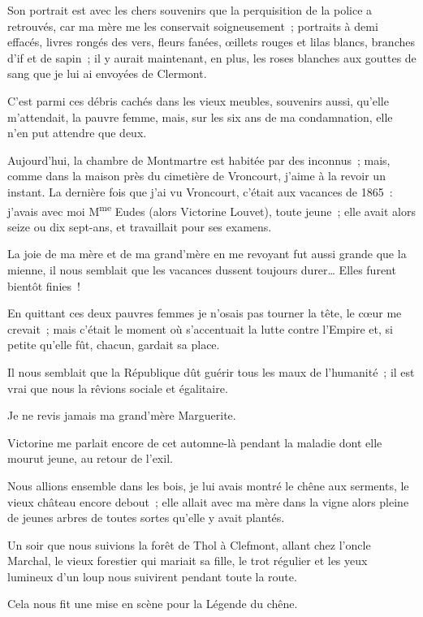 \documentclass[french,twoside]{book} %
\begin{document}
Son portrait est avec les chers souvenirs que la perquisition de la police a retrouvés, car ma mère me les conservait soigneusement ; portraits à demi effacés, livres rongés des vers, fleurs fanées, œillets rouges et lilas blancs, branches d’if et de sapin ; il y aurait maintenant, en plus, les roses blanches aux gouttes de sang que je lui ai envoyées de Clermont.\par
C’est parmi ces débris cachés dans les vieux meubles, souvenirs aussi, qu’elle m’attendait, la pauvre femme, mais, sur les six ans de ma condamnation, elle n’en put attendre que deux.\par
Aujourd’hui, la chambre de Montmartre est habitée par des inconnus ; mais, comme dans la maison près du cimetière de Vroncourt, j’aime à la revoir un instant. La dernière fois que j’ai vu Vroncourt, c’était aux vacances de 1865 : j’avais avec moi M\textsuperscript{me} Eudes (alors Victorine Louvet), toute jeune ; elle avait alors seize ou dix sept-ans, et travaillait pour ses examens.\par
La joie de ma mère et de ma grand’mère en me revoyant fut aussi grande que la mienne,  il nous semblait que les vacances dussent toujours durer… Elles furent bientôt finies !\par
En quittant ces deux pauvres femmes je n’osais pas tourner la tête, le cœur me crevait ; mais c’était le moment où s’accentuait la lutte contre l’Empire et, si petite qu’elle fût, chacun, gardait sa place.\par
Il nous semblait que la République dût guérir tous les maux de l’humanité ; il est vrai que nous la rêvions sociale et égalitaire.\par
Je ne revis jamais ma grand’mère Marguerite.\par
Victorine me parlait encore de cet automne-là pendant la maladie dont elle mourut jeune, au retour de l’exil.\par
Nous allions ensemble dans les bois, je lui avais montré le chêne aux serments, le vieux château encore debout ; elle allait avec ma mère dans la vigne alors pleine de jeunes arbres de toutes sortes qu’elle y avait plantés.\par
Un soir que nous suivions la forêt de Thol à Clefmont, allant chez l’oncle Marchal, le vieux forestier qui mariait sa fille, le trot régulier et les yeux lumineux d’un loup nous suivirent pendant toute la route.\par
Cela nous fit une mise en scène pour la Légende du chêne.\par
 
\end{document}
